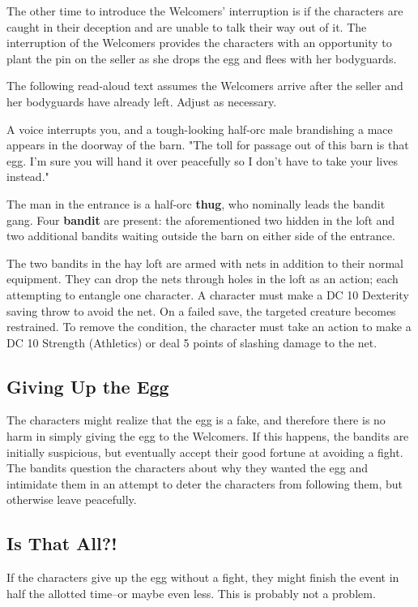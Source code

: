 \documentclass[10pt,a4paper,twoside,bg=print,twocolumn,openany,nodeprecatedcode]{dndbook}
\begin{document}
The other time to introduce the Welcomers' interruption is if the characters are caught in their deception and are unable to talk their way out of it. The interruption of the Welcomers provides the characters with an opportunity to plant the pin on the seller as she drops the egg and flees with her bodyguards.

The following read-aloud text assumes the Welcomers arrive after the seller and her bodyguards have already left. Adjust as necessary.

\begin{DndReadAloud}{}
A voice interrupts you, and a tough-looking half-orc male brandishing a mace appears in the doorway of the barn. "The toll for passage out of this barn is that egg. I'm sure you will hand it over peacefully so I don't have to take your lives instead."

\end{DndReadAloud}

The man in the entrance is a half-orc \textbf{thug}, who nominally leads the bandit gang. Four \textbf{bandit} are present: the aforementioned two hidden in the loft and two additional bandits waiting outside the barn on either side of the entrance.

The two bandits in the hay loft are armed with nets in addition to their normal equipment. They can drop the nets through holes in the loft as an action; each attempting to entangle one character. A character must make a DC 10 Dexterity saving throw to avoid the net. On a failed save, the targeted creature becomes restrained. To remove the condition, the character must take an action to make a DC 10 Strength (Athletics) or deal 5 points of slashing damage to the net.

\subsection{Giving Up the Egg}
The characters might realize that the egg is a fake, and therefore there is no harm in simply giving the egg to the Welcomers. If this happens, the bandits are initially suspicious, but eventually accept their good fortune at avoiding a fight. The bandits question the characters about why they wanted the egg and intimidate them in an attempt to deter the characters from following them, but otherwise leave peacefully.

\subsection{Is That All?!}
If the characters give up the egg without a fight, they might finish the event in half the allotted time--or maybe even less. This is probably not a problem.
\end{document}
